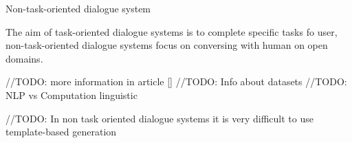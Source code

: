 Non-task-oriented dialogue system

The aim of task-oriented dialogue systems is to complete specific tasks fo user, non-task-oriented dialogue systems focus on conversing with human on open domains. 

//TODO: more information in article []
//TODO: Info about datasets
//TODO: NLP vs Computation linguistic

//TODO: In non task oriented dialogue systems it is very difficult to use template-based generation
\cite{stochastic_language_generation_ds}
